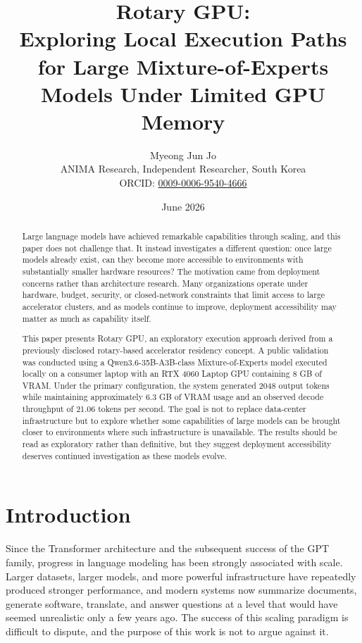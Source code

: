 \documentclass[11pt]{article}
\title{
Rotary GPU:\\
Exploring Local Execution Paths for Large Mixture-of-Experts Models Under Limited GPU Memory
}
\author{
Myeong Jun Jo\\
ANIMA Research, Independent Researcher, South Korea\\
ORCID: \href{https://orcid.org/0009-0006-9540-4666}{0009-0006-9540-4666}
}
\date{June 2026}
\begin{document}
\maketitle

\begin{abstract}
Large language models have achieved remarkable capabilities through scaling, and this paper does not challenge that. It instead investigates a different question: once large models already exist, can they become more accessible to environments with substantially smaller hardware resources? The motivation came from deployment concerns rather than architecture research. Many organizations operate under hardware, budget, security, or closed-network constraints that limit access to large accelerator clusters, and as models continue to improve, deployment accessibility may matter as much as capability itself.

This paper presents Rotary GPU, an exploratory execution approach derived from a previously disclosed rotary-based accelerator residency concept. A public validation was conducted using a Qwen3.6-35B-A3B-class Mixture-of-Experts model executed locally on a consumer laptop with an RTX 4060 Laptop GPU containing 8 GB of VRAM. Under the primary configuration, the system generated 2048 output tokens while maintaining approximately 6.3 GB of VRAM usage and an observed decode throughput of 21.06 tokens per second. The goal is not to replace data-center infrastructure but to explore whether some capabilities of large models can be brought closer to environments where such infrastructure is unavailable. The results should be read as exploratory rather than definitive, but they suggest deployment accessibility deserves continued investigation as these models evolve.
\end{abstract}

\section{Introduction}

Since the Transformer architecture and the subsequent success of the GPT family, progress in language modeling has been strongly associated with scale. Larger datasets, larger models, and more powerful infrastructure have repeatedly produced stronger performance, and modern systems now summarize documents, generate software, translate, and answer questions at a level that would have seemed unrealistic only a few years ago. The success of this scaling paradigm is difficult to dispute, and the purpose of this work is not to argue against it.
\end{document}
